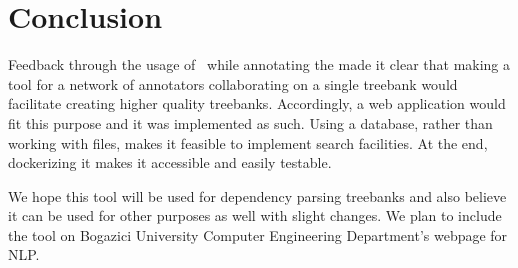 \section{Conclusion}
\label{sec:conclusion}
Feedback through the usage of \boatvone\  while annotating the \bountreebank{} made it clear that making a tool for a network of annotators collaborating on a single treebank would facilitate creating higher quality treebanks.
Accordingly, a web application would fit this purpose and it was implemented as such.
Using a database, rather than working with \conllu{} files, makes it feasible to implement search facilities.
At the end, dockerizing it makes it accessible and easily testable.

We hope this tool will be used for dependency parsing treebanks and also believe it can be used for other purposes as well with slight changes.
We plan to include the tool on Bogazici University Computer Engineering Department's webpage for NLP.

